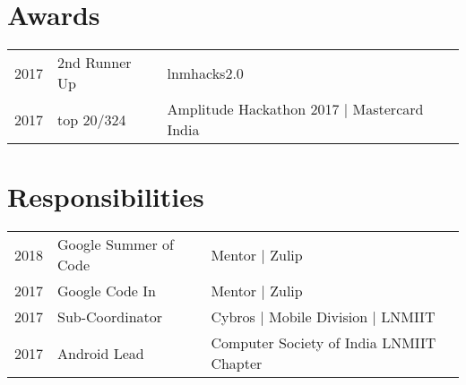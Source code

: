 \documentclass[a4paper]{deedy-resume} %
\begin{document}
\begin{minipage}[t]{0.66\textwidth}
    \sectionspace %
    
    
    \section{Awards} 
    
    \begin{tabular}{rll}
    2017	 & 2nd Runner Up & lnmhacks2.0\\
    2017	 & top 20/324 & Amplitude Hackathon 2017 | Mastercard India \\
    \end{tabular}
    
    \sectionspace %
    
    
    \section{Responsibilities} 
    
    \begin{tabular}{rll}
    2018 & Google Summer of Code & Mentor | Zulip\\
    2017 & Google Code In & Mentor | Zulip\\
    2017 & Sub-Coordinator & Cybros | Mobile Division | LNMIIT\\
    2017 & Android Lead & Computer Society of India LNMIIT Chapter\\
    \end{tabular}
    
    \sectionspace %
    
    
    \end{minipage} %
    
    
\end{document}
